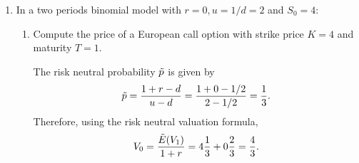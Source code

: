 \documentclass[11pt,a4,table]{article}
\begin{document}
\begin{enumerate}
    
    \item In a two periods binomial model with $r=0, u=1/d=2$ and $S_0 = 4$:
    
    \begin{enumerate}
        \item Compute the price of a European call option with strike price $K=4$ and maturity $T=1$.
        \begin{figure}[hp]
        \end{figure}
        The risk neutral probability $\Tilde{p}$ is given by
        \begin{equation*}
            \Tilde{p}=\frac{1+r-d}{u-d}=\frac{1+0-1/2}{2-1/2}=\frac{1}{3}.
        \end{equation*}
        Therefore, using the risk neutral valuation formula,
        \begin{equation*}
            V_0 = \frac{\Tilde{E}(V_1)}{1+r}=4\frac{1}{3}+0\frac{2}{3}=\frac{4}{3}.
        \end{equation*}
        

\end{enumerate}
\end{enumerate}
\end{document}

